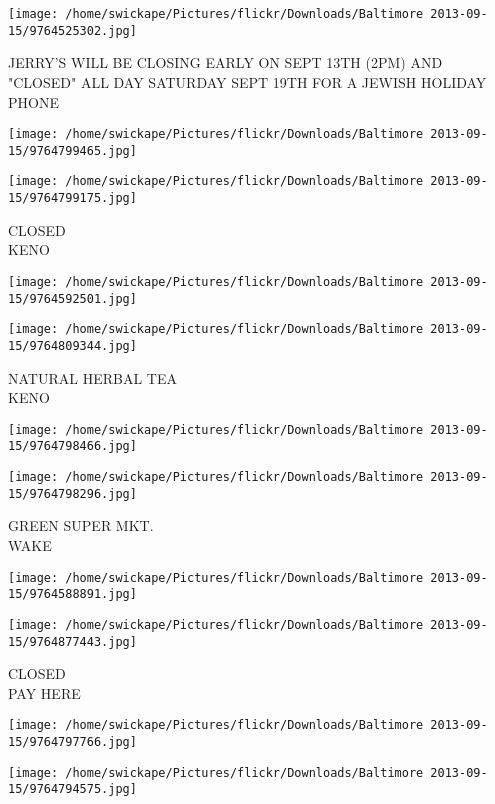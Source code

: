 \documentclass[10pt,letterpaper]{article}
\begin{document}
\vspace{0.25in}
\texttt{[image: /home/swickape/Pictures/flickr/Downloads/Baltimore 2013-09-15/9764525302.jpg]}

JERRY'S WILL BE CLOSING EARLY ON SEPT 13TH (2PM) AND "CLOSED" ALL DAY SATURDAY SEPT 19TH FOR A JEWISH HOLIDAY\\
PHONE
\pagebreak

\texttt{[image: /home/swickape/Pictures/flickr/Downloads/Baltimore 2013-09-15/9764799465.jpg]}

\vspace{0.25in}
\texttt{[image: /home/swickape/Pictures/flickr/Downloads/Baltimore 2013-09-15/9764799175.jpg]}

CLOSED\\
KENO
\pagebreak

\texttt{[image: /home/swickape/Pictures/flickr/Downloads/Baltimore 2013-09-15/9764592501.jpg]}

\vspace{0.25in}
\texttt{[image: /home/swickape/Pictures/flickr/Downloads/Baltimore 2013-09-15/9764809344.jpg]}

NATURAL HERBAL TEA\\
KENO
\pagebreak

\texttt{[image: /home/swickape/Pictures/flickr/Downloads/Baltimore 2013-09-15/9764798466.jpg]}

\vspace{0.25in}
\texttt{[image: /home/swickape/Pictures/flickr/Downloads/Baltimore 2013-09-15/9764798296.jpg]}

GREEN SUPER MKT.\\
WAKE
\pagebreak

\texttt{[image: /home/swickape/Pictures/flickr/Downloads/Baltimore 2013-09-15/9764588891.jpg]}

\vspace{0.25in}
\texttt{[image: /home/swickape/Pictures/flickr/Downloads/Baltimore 2013-09-15/9764877443.jpg]}

CLOSED\\
PAY HERE
\pagebreak

\texttt{[image: /home/swickape/Pictures/flickr/Downloads/Baltimore 2013-09-15/9764797766.jpg]}

\vspace{0.25in}
\texttt{[image: /home/swickape/Pictures/flickr/Downloads/Baltimore 2013-09-15/9764794575.jpg]}
\end{document}
